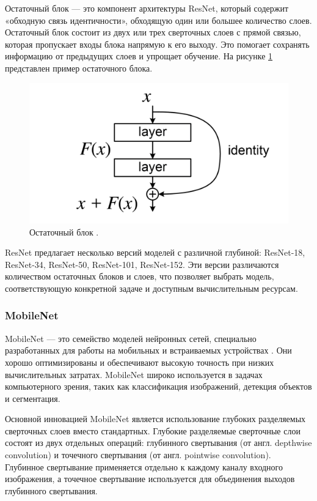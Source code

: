 \documentclass[a4paper,12pt]{extarticle}
\begin{document}
Остаточный блок — это компонент архитектуры ResNet, который содержит «обходную связь идентичности», обходящую один или большее количество слоев. Остаточный блок состоит из двух или трех сверточных слоев с прямой связью, которая пропускает входы блока напрямую к его выходу. Это помогает сохранять информацию от предыдущих слоев и упрощает обучение. На рисунке \ref{fig:res-block} представлен пример остаточного блока.

\begin{figure}[ht]
	\centering
	\includegraphics[scale=1.5]{res_block.png}
	\caption{Остаточный блок \cite{resnet}.}
	\label{fig:res-block}
\end{figure}

ResNet предлагает несколько версий моделей с различной глубиной: ResNet-18, ResNet-34, ResNet-50, ResNet-101, ResNet-152. Эти версии различаются количеством остаточных блоков и слоев, что позволяет выбрать модель, соответствующую конкретной задаче и доступным вычислительным ресурсам.

\subsubsection{MobileNet}

MobileNet — это семейство моделей нейронных сетей, специально разработанных для работы на мобильных и встраиваемых устройствах \cite{mobilenet}. Они хорошо оптимизированы и обеспечивают высокую точность при низких вычислительных затратах. MobileNet широко используется в задачах компьютерного зрения, таких как классификация изображений, детекция объектов и сегментация.

Основной инновацией MobileNet является использование глубоких разделяемых сверточных слоев вместо стандартных. Глубокие разделяемые сверточные слои состоят из двух отдельных операций: глубинного свертывания (от англ. depthwise convolution) и точечного свертывания (от англ. pointwise convolution). Глубинное свертывание применяется отдельно к каждому каналу входного изображения, а точечное свертывание используется для объединения выходов глубинного свертывания.
\end{document}
